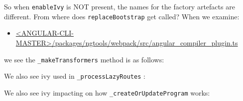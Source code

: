 So when
\texttt{enableIvy}
is NOT present, the names for the factory artefacts are different.
From where does
\texttt{replaceBootstrap}
get called? When we examine:

\begin{itemize}
  \item \href{https://github.com/angular/angular-cli/blob/master/packages/ngtools/webpack/src/angular_compiler_plugin.ts}
        {<ANGULAR-CLI-MASTER>/packages/ngtools/webpack/src/angular\_compiler\_plugin.ts}
\end{itemize}

we see the
\texttt{\_makeTransformers}
method is as follows:



We also see ivy used in
\texttt{\_processLazyRoutes}
:



We also see ivy impacting on how
\texttt{\_createOrUpdateProgram}
works:






